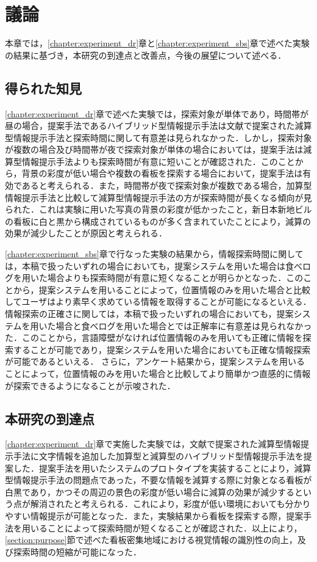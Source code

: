 \chapter{議論}
\label{chapter:discussion}
本章では，\ref{chapter:experiment_dr}章と\ref{chapter:experiment_sbs}章で述べた実験の結果に基づき，本研究の到達点と改善点，今後の展望について述べる．

\section{得られた知見}
\label{section:obtained_knowledge}
  \ref{chapter:experiment_dr}章で述べた実験では，探索対象が単体であり，時間帯が昼の場合，提案手法であるハイブリッド型情報提示手法は文献\cite{Fujita:2013}で提案された減算型情報提示手法と探索時間に関して有意差は見られなかった．しかし，探索対象が複数の場合及び時間帯が夜で探索対象が単体の場合においては，提案手法は減算型情報提示手法よりも探索時間が有意に短いことが確認された．このことから，背景の彩度が低い場合や複数の看板を探索する場合において，提案手法は有効であると考えられる．また，時間帯が夜で探索対象が複数である場合，加算型情報提示手法と比較して減算型情報提示手法の方が探索時間が長くなる傾向が見られた．これは実験に用いた写真の背景の彩度が低かったこと，新日本新地ビルの看板に白と黒から構成されているものが多く含まれていたことにより，減算の効果が減少したことが原因と考えられる．

  \ref{chapter:experiment_sbs}章で行なった実験の結果から，情報探索時間に関しては，本稿で扱ったいずれの場合においても，提案システムを用いた場合は食べログを用いた場合よりも探索時間が有意に短くなることが明らかとなった．このことから，提案システムを用いることによって，位置情報のみを用いた場合と比較してユーザはより素早く求めている情報を取得することが可能になるといえる．
  情報探索の正確さに関しては，本稿で扱ったいずれの場合においても，提案システムを用いた場合と食べログを用いた場合とでは正解率に有意差は見られなかった．このことから，言語障壁がなければ位置情報のみを用いても正確に情報を探索することが可能であり，提案システムを用いた場合においても正確な情報探索が可能であるといえる．
  さらに，アンケート結果から，提案システムを用いることによって，位置情報のみを用いた場合と比較してより簡単かつ直感的に情報が探索できるようになることが示唆された．

\section{本研究の到達点}
  \ref{chapter:experiment_dr}章で実施した実験では，文献\cite{Fujita:2013}で提案された減算型情報提示手法に文字情報を追加した加算型と減算型のハイブリッド型情報提示手法を提案した．提案手法を用いたシステムのプロトタイプを実装することにより，減算型情報提示手法の問題点であった，不要な情報を減算する際に対象となる看板が白黒であり，かつその周辺の景色の彩度が低い場合に減算の効果が減少するという点が解消されたと考えられる．これにより，彩度が低い環境においても分かりやすい情報提示が可能となった．また，実験結果から看板を探索する際，提案手法を用いることによって探索時間が短くなることが確認された．以上により，\ref{section:purpose}節で述べた看板密集地域における視覚情報の識別性の向上，及び探索時間の短縮が可能になった．

